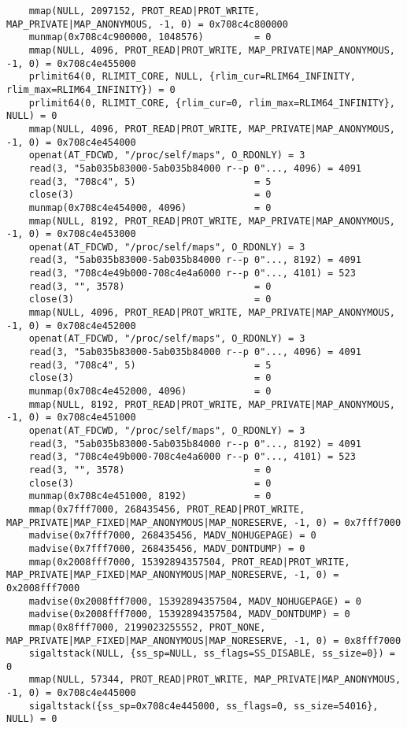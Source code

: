 \documentclass[12pt]{article}
\begin{document}
\begin{verbatim}
	mmap(NULL, 2097152, PROT_READ|PROT_WRITE, MAP_PRIVATE|MAP_ANONYMOUS, -1, 0) = 0x708c4c800000
	munmap(0x708c4c900000, 1048576)         = 0
	mmap(NULL, 4096, PROT_READ|PROT_WRITE, MAP_PRIVATE|MAP_ANONYMOUS, -1, 0) = 0x708c4e455000
	prlimit64(0, RLIMIT_CORE, NULL, {rlim_cur=RLIM64_INFINITY, rlim_max=RLIM64_INFINITY}) = 0
	prlimit64(0, RLIMIT_CORE, {rlim_cur=0, rlim_max=RLIM64_INFINITY}, NULL) = 0
	mmap(NULL, 4096, PROT_READ|PROT_WRITE, MAP_PRIVATE|MAP_ANONYMOUS, -1, 0) = 0x708c4e454000
	openat(AT_FDCWD, "/proc/self/maps", O_RDONLY) = 3
	read(3, "5ab035b83000-5ab035b84000 r--p 0"..., 4096) = 4091
	read(3, "708c4", 5)                     = 5
	close(3)                                = 0
	munmap(0x708c4e454000, 4096)            = 0
	mmap(NULL, 8192, PROT_READ|PROT_WRITE, MAP_PRIVATE|MAP_ANONYMOUS, -1, 0) = 0x708c4e453000
	openat(AT_FDCWD, "/proc/self/maps", O_RDONLY) = 3
	read(3, "5ab035b83000-5ab035b84000 r--p 0"..., 8192) = 4091
	read(3, "708c4e49b000-708c4e4a6000 r--p 0"..., 4101) = 523
	read(3, "", 3578)                       = 0
	close(3)                                = 0
	mmap(NULL, 4096, PROT_READ|PROT_WRITE, MAP_PRIVATE|MAP_ANONYMOUS, -1, 0) = 0x708c4e452000
	openat(AT_FDCWD, "/proc/self/maps", O_RDONLY) = 3
	read(3, "5ab035b83000-5ab035b84000 r--p 0"..., 4096) = 4091
	read(3, "708c4", 5)                     = 5
	close(3)                                = 0
	munmap(0x708c4e452000, 4096)            = 0
	mmap(NULL, 8192, PROT_READ|PROT_WRITE, MAP_PRIVATE|MAP_ANONYMOUS, -1, 0) = 0x708c4e451000
	openat(AT_FDCWD, "/proc/self/maps", O_RDONLY) = 3
	read(3, "5ab035b83000-5ab035b84000 r--p 0"..., 8192) = 4091
	read(3, "708c4e49b000-708c4e4a6000 r--p 0"..., 4101) = 523
	read(3, "", 3578)                       = 0
	close(3)                                = 0
	munmap(0x708c4e451000, 8192)            = 0
	mmap(0x7fff7000, 268435456, PROT_READ|PROT_WRITE, MAP_PRIVATE|MAP_FIXED|MAP_ANONYMOUS|MAP_NORESERVE, -1, 0) = 0x7fff7000
	madvise(0x7fff7000, 268435456, MADV_NOHUGEPAGE) = 0
	madvise(0x7fff7000, 268435456, MADV_DONTDUMP) = 0
	mmap(0x2008fff7000, 15392894357504, PROT_READ|PROT_WRITE, MAP_PRIVATE|MAP_FIXED|MAP_ANONYMOUS|MAP_NORESERVE, -1, 0) = 0x2008fff7000
	madvise(0x2008fff7000, 15392894357504, MADV_NOHUGEPAGE) = 0
	madvise(0x2008fff7000, 15392894357504, MADV_DONTDUMP) = 0
	mmap(0x8fff7000, 2199023255552, PROT_NONE, MAP_PRIVATE|MAP_FIXED|MAP_ANONYMOUS|MAP_NORESERVE, -1, 0) = 0x8fff7000
	sigaltstack(NULL, {ss_sp=NULL, ss_flags=SS_DISABLE, ss_size=0}) = 0
	mmap(NULL, 57344, PROT_READ|PROT_WRITE, MAP_PRIVATE|MAP_ANONYMOUS, -1, 0) = 0x708c4e445000
	sigaltstack({ss_sp=0x708c4e445000, ss_flags=0, ss_size=54016}, NULL) = 0

\end{verbatim}
\end{document}
